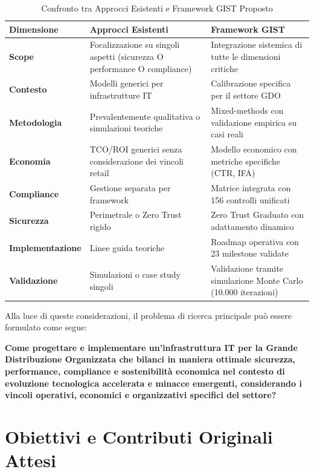 \begin{table}[htbp]
\centering
 \small
 \sffamily 
\caption{Confronto tra Approcci Esistenti e Framework GIST Proposto}
\label{tab:confronto_approcci}
\begin{tabularx}{\textwidth}{@{}lXX@{}}
\toprule
\textbf{Dimensione} & \textbf{Approcci Esistenti} & \textbf{Framework GIST} \\
\midrule
\textbf{Scope} & Focalizzazione su singoli aspetti (sicurezza O performance O compliance) & Integrazione sistemica di tutte le dimensioni critiche \\
\textbf{Contesto} & Modelli generici per infrastrutture IT & Calibrazione specifica per il settore GDO \\
\textbf{Metodologia} & Prevalentemente qualitativa o simulazioni teoriche & Mixed-methods con validazione empirica su casi reali \\
\textbf{Economia} & TCO/ROI generici senza considerazione dei vincoli retail & Modello economico con metriche specifiche (CTR, IFA) \\
\textbf{Compliance} & Gestione separata per framework & Matrice integrata con 156 controlli unificati \\
\textbf{Sicurezza} & Perimetrale o Zero Trust rigido & Zero Trust Graduato con adattamento dinamico \\
\textbf{Implementazione} & Linee guida teoriche & Roadmap operativa con 23 milestone validate \\
\textbf{Validazione} & Simulazioni o case study singoli & Validazione tramite simulazione Monte Carlo (10.000 iterazioni) \\
\bottomrule
\end{tabularx}
\end{table}

Alla luce di queste considerazioni, il problema di ricerca principale può essere formulato come segue:
\label{ssec:domanda_ricerca}

\textbf{Come progettare e implementare un'infrastruttura IT per la Grande Distribuzione Organizzata che bilanci in maniera ottimale sicurezza, performance, compliance e sostenibilità economica nel contesto di evoluzione tecnologica accelerata e minacce emergenti, considerando i vincoli operativi, economici e organizzativi specifici del settore?}

\section{\texorpdfstring{\textbf{Obiettivi e Contributi Originali Attesi}}{1.3 - Obiettivi e Contributi Originali Attesi}}

